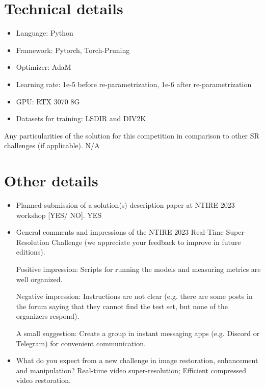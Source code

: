 \documentclass{article}
\begin{document}
\section{Technical details}
\begin{itemize}
    \item Language: Python
    \item Framework: Pytorch, Torch-Pruning\cite{fang2023depgraph}
    \item Optimizer: AdaM
    \item Learning rate: 1e-5 before re-parametrization, 1e-6 after re-parametrization
    \item GPU: RTX 3070 8G
    \item Datasets for training: LSDIR and DIV2K
\end{itemize}

\vspace{4mm}
\noindent Any particularities of the solution for this competition in comparison to other SR challenges (if applicable).
N/A

\section{Other details}
\begin{itemize}

\item Planned submission of a solution(s) description paper at NTIRE 2023 workshop [YES/ NO].
YES

\item General comments and impressions of the NTIRE 2023 Real-Time Super-Resolution Challenge (we appreciate your feedback to improve in future editions).

Positive impression: Scripts for running the models and measuring metrics are well organized.

Negative impression: Instructions are not clear (e.g. there are some posts in the forum saying that they cannot find the test set, but none of the organizers respond).

A small suggestion: Create a group in instant messaging apps (e.g. Discord or Telegram) for convenient communication.

\item What do you expect from a new challenge in image restoration, enhancement and manipulation?
Real-time video super-resolution; Efficient compressed video restoration.

\end{itemize}


{\small


}
\end{document}
